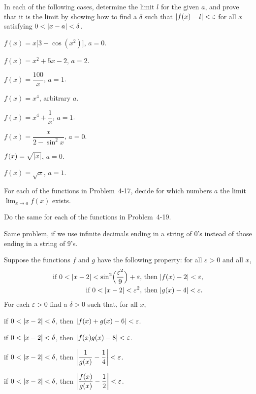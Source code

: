 In each of the following cases, determine the limit $l$ for the given $a$, and
prove that it is the limit by showing how to find a $\delta$ such that
$\abs{f(x)-l}<\varepsilon$ for all $x$ satisfying $0<\abs{x-a}<\delta$.
\begin{romans}
\item $f(x)=x\bigl[3-\cos(x^2)\bigr]$, $a=0$.
\item $f(x)=x^2+5x-2$, $a=2$.
\item $f(x)=\dfrac{100}{x}$, $a=1$.
\item $f(x)=x^4$, arbitrary $a$.
\item $f(x)=x^4+\dfrac{1}{x}$, $a=1$.
\item $f(x)=\dfrac{x}{2-\sin^2 x}$, $a=0$.
\item $f(x)=\sqrt{\abs{x}}$, $a=0$.
\item $f(x)=\sqrt{x}$, $a=1$.
\end{romans}

For each of the functions in Problem~4-17, decide for which numbers $a$ the
limit $\lim_{x\to a}f(x)$ exists.

\begin{letters}
\item Do the same for each of the functions in Problem~4-19.
\item Same problem, if we use infinite decimals ending in a string of $0$'s
instead of those ending in a string of $9$'s.
\end{letters}

Suppose the functions $f$ and $g$ have the following property: for all
$\varepsilon>0$ and all $x$,
\begin{align*}
\text{if }0<\abs{x-2}<\sin^2\Bigl(\frac{\varepsilon^2}{9}\Bigr)+\varepsilon,
&\text{ then }\abs{f(x)-2}<\varepsilon,\\
\text{if }0<\abs{x-2}<\varepsilon^2,
&\text{ then }\abs{g(x)-4}<\varepsilon.
\end{align*}
For each $\varepsilon>0$ find a $\delta>0$ such that, for all $x$,
\begin{romans}
\item if $0<\abs{x-2}<\delta$, then $\abs{f(x)+g(x)-6}<\varepsilon$.
\item if $0<\abs{x-2}<\delta$, then $\abs{f(x)g(x)-8}<\varepsilon$.
\item if $0<\abs{x-2}<\delta$, then
$\abs*{\dfrac{1}{g(x)}-\dfrac{1}{4}}<\varepsilon$.
\item if $0<\abs{x-2}<\delta$, then
$\abs*{\dfrac{f(x)}{g(x)}-\dfrac{1}{2}}<\varepsilon$.
\end{romans}

